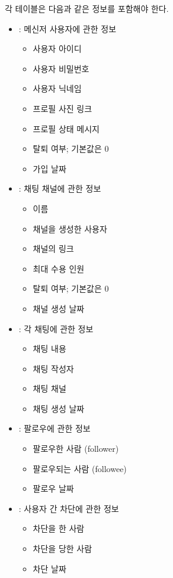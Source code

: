 각 테이블은 다음과 같은 정보를 포함해야 한다.

\begin{itemize}
    \item {} : 메신저 사용자에 관한 정보
    \begin{itemize}
        \item 사용자 아이디
        \item 사용자 비밀번호
        \item 사용자 닉네임
        \item 프로필 사진 링크
        \item 프로필 상태 메시지
        \item 탈퇴 여부; 기본값은 0
        \item 가입 날짜
    \end{itemize}
    \item {}: 채팅 채널에 관한 정보
    \begin{itemize}
        \item 이름
        \item 채널을 생성한 사용자
        \item 채널의 링크
        \item 최대 수용 인원
        \item 탈퇴 여부; 기본값은 0
        \item 채널 생성 날짜
    \end{itemize}
    \item {}: 각 채팅에 관한 정보
    \begin{itemize}
        \item 채팅 내용
        \item 채팅 작성자
        \item 채팅 채널
        \item 채팅 생성 날짜
    \end{itemize}
    \item {}: 팔로우에 관한 정보
    \begin{itemize}
        \item 팔로우한 사람 (follower)
        \item 팔로우되는 사람 (followee)
        \item 팔로우 날짜
    \end{itemize}
    \item {}: 사용자 간 차단에 관한 정보
    \begin{itemize}
        \item 차단을 한 사람
        \item 차단을 당한 사람
        \item 차단 날짜
    \end{itemize}
\end{itemize}


